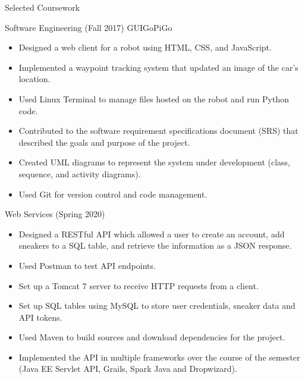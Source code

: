 \documentclass[]{johnsoncv}
\begin{document}
	\begin{cvsection}{Selected Coursework}
		
		\begin{cvsubsection}{Software Engineering (Fall 2017)}{}{}
			GUIGoPiGo
			\begin{itemize}
				\item Designed a web client for a robot using HTML, CSS, and JavaScript.
				\item Implemented a waypoint tracking system that updated an image of the car's location.
				\item Used Linux Terminal to manage files hosted on the robot and run Python code.
				\item Contributed to the software requirement specifications document (SRS) that described the goals and purpose of the project.
				\item Created UML diagrams to represent the system under development (class, sequence, and activity diagrams).
				\item Used Git for version control and code management.
			\end{itemize}
		\end{cvsubsection}

		\begin{cvsubsection}{Web Services (Spring 2020)}{}{}
			\begin{itemize}
				\item Designed a RESTful API which allowed a user to create an account, add sneakers to a SQL table, and retrieve the information as a JSON response.
				\item Used Postman to test API endpoints.
				\item Set up a Tomcat 7 server to receive HTTP requests from a client.
				\item Set up SQL tables using MySQL to store user credentials, sneaker data and API tokens.
				\item Used Maven to build sources and download dependencies for the project.
				\item Implemented the API in multiple frameworks over the course of the semester (Java EE Servlet API, Grails, Spark Java and Dropwizard).
			\end{itemize}
		\end{cvsubsection}	


\end{cvsection}
\end{document}
